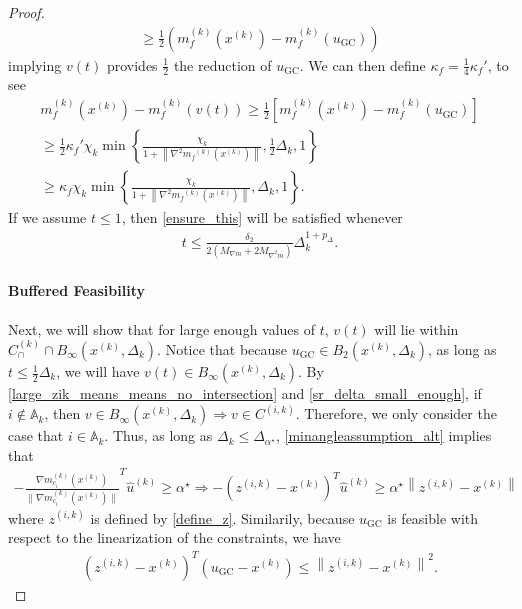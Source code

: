 \documentclass{article}
\theoremstyle{case}
\numberwithin{theorem}{subsection}
\newcommand{\activeconstraintsk}{{\mathbb A_{k}}}
\newcommand{\capcones}{{C^{(k)}_{\cap}}}
\newcommand{\dk}{\Delta_k}
\newcommand{\gmcik}{{\nabla m_{c_i}^{(k)}\left(\xk\right)}}
\newcommand{\huk}{{{\hat u}^{(k)}}}
\newcommand{\maxmodelhessian}{{M_{\nabla^2 m}}}
\newcommand{\mfk}{{{m}_f}^{(k)}}
\newcommand{\minanglealpha}{{ \alpha^{\star} }}
\newcommand{\minangledelta}{{\Delta_{\alpha^{\star}}}}
\newcommand{\tr}{{ B_{\infty}\left(\xk, \dk\right) }}
\newcommand{\xk}{x^{(k)}}
\newcommand{\zik}{{z^{(i, k)}}}
\newcommand{\maxmodelgrad}{{M_{\nabla m}}}
\newcommand{\fik}{{C^{(i, k)}}}
\begin{document}
\begin{proof}
\begin{align}
\ge \frac 1 2 \left(m_f^{(k)}(\xk) - m_f^{(k)}(u_{\textrm{GC}})\right) \label{sr_sr}
\end{align}
implying $v(t)$ provides $\frac 1 2$ the reduction of $u_{\textrm{GC}}$.
We can then define $\kappa_f = \frac 1 4 \kappa_f'$, to see
\begin{align*}
m_f^{(k)}\left(\xk\right) - m_f^{(k)}\left(v(t)\right)
\ge \frac 1 2 \left[m_f^{(k)}(\xk) - m_f^{(k)}(u_{\textrm{GC}})\right] \\
\ge \frac 1 2 \kappa_f' \chi_k \min\left\{ \frac{\chi_k}{1+\left\|\nabla^2 \mfk(\xk)\right\|}, \frac 1 2 \dk, 1 \right\} \\
\ge \kappa_f \chi_k \min\left\{ \frac{\chi_k}{1+\left\|\nabla^2 \mfk(\xk)\right\|}, \dk, 1 \right\}.
\end{align*}
If we assume $t \le 1$, then \cref{ensure_this} will be satisfied whenever
\begin{align*}
t \le \frac {\delta_2}{2\left(\maxmodelgrad + 2\maxmodelhessian\right)} \dk^{1 + p_{\Delta}}.
\end{align*}




\paragraph{Buffered Feasibility}
Next, we will show that for large enough values of $t$, $v(t)$ will lie within $\capcones \cap \tr$.
Notice that because $u_{\textrm{GC}} \in B_2\left(\xk, \dk\right)$, as long as $t \le \frac 1 2 \dk$, we will have $v(t) \in \tr$.
By \cref{large_zik_means_means_no_intersection} and \cref{sr_delta_small_enough}, if $i \not \in \activeconstraintsk$, then $v \in \tr \Longrightarrow v \in \fik$.
Therefore, we only consider the case that $i \in \activeconstraintsk$.
Thus, as long as $\dk \le \minangledelta$, \cref{minangleassumption_alt} implies that
\begin{align}
-\frac {\gmcik}{\|\gmcik\|} ^T\huk \ge \minanglealpha \Longrightarrow -\left(\zik - \xk\right)^T\huk \ge \minanglealpha \left\|\zik - \xk\right\| \label{u_is_feasible}
\end{align}
where $\zik$ is defined by \cref{define_z}.
Similarily, because $u_{\textrm{GC}}$ is feasible with respect to the linearization of the constraints, we have
\begin{align}
\left(\zik - \xk\right)^T(u_{\textrm{GC}} - \xk) \le \left\|\zik - \xk\right\|^2. \label{gc_is_feasible}
\end{align}


\end{proof}
\end{document}
